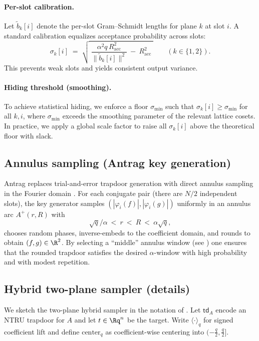 \paragraph{Per-slot calibration.}
Let \(\widetilde{b}_k[i]\) denote the per-slot Gram--Schmidt lengths for plane \(k\) at slot \(i\). A standard
calibration equalizes acceptance probability across slots:
\[
  \sigma_k[i]
  \;=\;
  \sqrt{\ \frac{\alpha^2 q\,R_{\mathrm{acc}}^2}{\|\widetilde{b}_k[i]\|^2}\ -\ R_{\mathrm{acc}}^2\ }
  \qquad(k\in\{1,2\}).
\]
This prevents weak slots and yields consistent output variance.

\paragraph{Hiding threshold (smoothing).}
To achieve statistical hiding, we enforce a floor \(\sigma_{\min}\) such that \(\sigma_k[i]\ge \sigma_{\min}\) for all
\(k,i\), where \(\sigma_{\min}\) exceeds the smoothing parameter of the relevant lattice cosets. In practice, we apply a
global scale factor to raise all \(\sigma_k[i]\) above the theoretical floor with slack.

\subsection{Annulus sampling (Antrag key generation)}
\label{subsec:antrag}
Antrag replaces trial-and-error trapdoor generation with direct annulus sampling in the Fourier domain
\cite{EPRINT:ENSTW23}. For each conjugate pair (there are \(N/2\) independent slots), the key generator samples
\((|\varphi_i(f)|,|\varphi_i(g)|)\) uniformly in an annulus arc \(A^+(r,R)\) with
\[
  \sqrt{q}/\alpha \ <\ r \ <\ R \ <\ \alpha\sqrt{q},
\]
chooses random phases, inverse-embeds to the coefficient domain, and rounds to obtain \((f,g)\in\R^2\). By selecting a
``middle'' annulus window (see \cite{EPRINT:ENSTW23}) one ensures that the rounded trapdoor satisfies the desired
\(\alpha\)-window with high probability and with modest repetition.

\subsection{Hybrid two-plane sampler (details)}
\label{subsec:hybrid-sampler}
We sketch the two-plane hybrid sampler in the notation of \cite{EPRINT:ENSTW23}. Let \(\mathsf{td}_A\) encode an
NTRU trapdoor for \(A\) and let \(t\in\Rq^n\) be the target. Write \(\langle\cdot\rangle_q\) for signed coefficient lift
and define \(\mathrm{center}_q\) as coefficient-wise centering into \((-\frac{q}{2},\frac{q}{2}]\).

